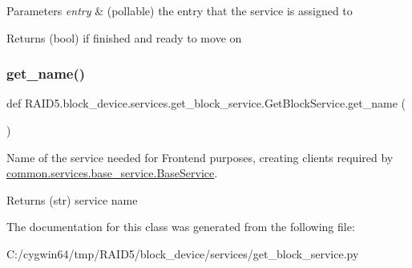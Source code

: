 \begin{DoxyParams}{Parameters}
{\em entry} & (pollable) the entry that the service is assigned to \\
\hline
\end{DoxyParams}
\begin{DoxyReturn}{Returns}
(bool) if finished and ready to move on 
\end{DoxyReturn}
\mbox{\label{class_r_a_i_d5_1_1block__device_1_1services_1_1get__block__service_1_1_get_block_service_a813d2b4bd5bc7a7fea09475792396db2}} 
\subsubsection{\texorpdfstring{get\+\_\+name()}{get\_name()}}
{\footnotesize\ttfamily def R\+A\+I\+D5.\+block\+\_\+device.\+services.\+get\+\_\+block\+\_\+service.\+Get\+Block\+Service.\+get\+\_\+name (\begin{DoxyParamCaption}{ }\end{DoxyParamCaption})\hspace{0.3cm}{\ttfamily [static]}}



Name of the service needed for Frontend purposes, creating clients required by \hyperlink{class_r_a_i_d5_1_1common_1_1services_1_1base__service_1_1_base_service}{common.\+services.\+base\+\_\+service.\+Base\+Service}. 

\begin{DoxyReturn}{Returns}
(str) service name 
\end{DoxyReturn}


The documentation for this class was generated from the following file\+:\begin{DoxyCompactItemize}
\item 
C\+:/cygwin64/tmp/\+R\+A\+I\+D5/block\+\_\+device/services/get\+\_\+block\+\_\+service.\+py\end{DoxyCompactItemize}
